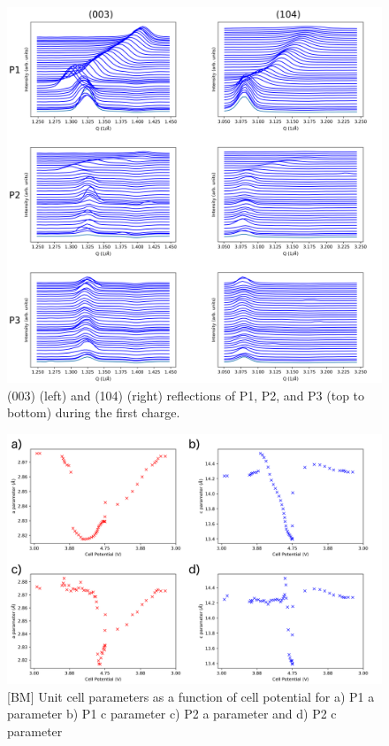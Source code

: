 \documentclass{article}
\begin{document}
\begin{figure}
  \includegraphics[width=\linewidth]{figures/ind-peaks.png}
  \caption{(003) (left) and (104) (right) reflections of P1, P2, and P3
    (top to bottom) during the first charge.}
  \label{fig:ind-peaks}
\end{figure}


\begin{figure}
  \includegraphics[width=\linewidth]{figures/cell-pars.png}
  \caption{[BM] Unit cell parameters as a function of cell potential for a)
  P1 a parameter b) P1 c parameter c) P2 a parameter and d) P2 c parameter}
  \label{fig:cell-pars}
\end{figure}
\end{document}
